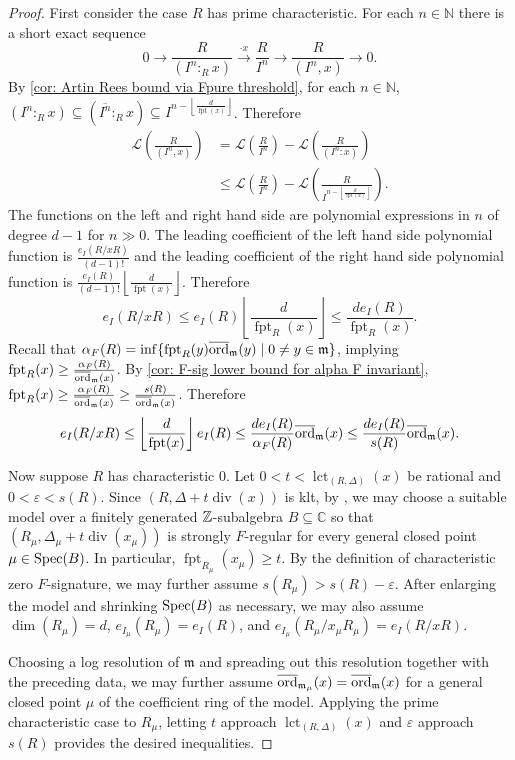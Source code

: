 \documentclass[12pt]{amsart}
\numberwithin{equation}{theorem}
\theoremstyle{plain}
\newcommand{\fm}{\mathfrak{m}}
\newcommand{\CC}{\mathbb{C}}
\newcommand{\NN}{\mathbb{N}}
\DeclareMathOperator{\lct}{lct}
\DeclareMathOperator{\FPT}{fpt}
\begin{document}
\begin{proof}
    First consider the case $R$ has prime characteristic. For each $n\in\NN$ there is a short exact sequence
    \[
    0\to \frac{R}{(I^{n}:_Rx)}\xrightarrow{\cdot x}\frac{R}{I^n}\to \frac{R}{(I^n,x)}\to 0.
    \]
    By \cref{cor: Artin Rees bound via Fpure threshold}, for each $n\in\NN$, $(I^n:_Rx)\subseteq (\overline{I^n}:_Rx)\subseteq I^{n-\left\lfloor \frac{d}{\FPT(x)}\right\rfloor}$. Therefore
    \begin{align*}
        \mathcal{L}\left(\frac{R}{(I^n,x)}\right) &= \mathcal{L}\left(\frac{R}{I^n}\right) -\mathcal{L}\left(\frac{R}{(I^n:x)}\right)\\
        &\leq \mathcal{L}\left(\frac{R}{I^n}\right) -\mathcal{L}\left(\frac{R}{I^{n-\left\lfloor \frac{d}{\FPT(x)}\right\rfloor}}\right).
    \end{align*}
    The functions on the left and right hand side are polynomial expressions in $n$ of degree $d-1$ for $n\gg 0$. The leading coefficient of the left hand side polynomial function is $\frac{e_I(R/xR)}{(d-1)!}$ and the leading coefficient of the right hand side polynomial function is $\frac{e_I(R)}{(d-1)!}\left\lfloor \frac{d}{\FPT(x)}\right\rfloor$. Therefore
    \[
    e_I(R/xR)\leq e_I(R)\left\lfloor \frac{d}{\FPT_R(x)}\right\rfloor\leq \frac{de_I(R)}{\FPT_R(x)}.
    \]
    Recall that $\alpha_F(R) = \inf\{\FPT_R(y)\overline{\ord}_{\fm}(y)\mid 0\not=y\in \fm\}$, implying $\FPT_R(x)\geq \frac{\alpha_F(R)}{\overline{\ord}_{\fm}(x)}$. By \cref{cor: F-sig lower bound for alpha F invariant}, $\fpt_R(x)\geq \frac{\alpha_F(R)}{\overline{\ord}_{\fm}(x)}\geq \frac{s(R)}{\overline{\ord}_{\fm}(x)}$. Therefore
    \[
    e_I(R/xR)\leq \left\lfloor \frac{d}{\FPT(x)}\right\rfloor e_I(R)\leq  \frac{de_I(R)}{\alpha_F(R)}\overline{\ord}_{\fm}(x) \leq \frac{de_I(R)}{s(R)}\overline{\ord}_{\fm}(x).
    \]

    Now suppose $R$ has characteristic $0$. Let $0<t<\lct_{(R,\Delta)}(x)$ be rational and $0<\varepsilon<s(R)$. Since $(R,\Delta+t\operatorname{div}(x))$ is klt, by \cite[Corollary~3.4]{Takagi2004}, we may choose a suitable model over a finitely generated $\mbox{$\mathbb{Z}$}$-subalgebra $B\subseteq\CC$ so that $(R_\mu,\Delta_\mu+t\operatorname{div}(x_\mu))$ is strongly $F$-regular for every general closed point $\mu\in\operatorname{{Spec}}(B)$. In particular, $\FPT_{R_\mu}(x_\mu)\geq t$. By the definition of characteristic zero $F$-signature, we may further assume $s(R_\mu)>s(R)-\varepsilon$. After enlarging the model and shrinking $\operatorname{{Spec}}(B)$ as necessary, we may also assume $\dim(R_\mu)=d$, $e_{I_\mu}(R_\mu)=e_I(R)$, and $e_{I_\mu}(R_\mu/x_\mu R_\mu)=e_I(R/xR)$.

    Choosing a log resolution of $\fm$ and spreading out this resolution together with the preceding data, we may further assume $\overline{\ord}_{\fm_{\mu}}(x) = \overline{\ord}_{\fm}(x)$ for a general closed point $\mu$ of the coefficient ring of the model. Applying the prime characteristic case to $R_\mu$, letting $t$ approach $\lct_{(R,\Delta)}(x)$ and $\varepsilon$ approach $s(R)$ provides the desired inequalities.
\end{proof}
\end{document}
